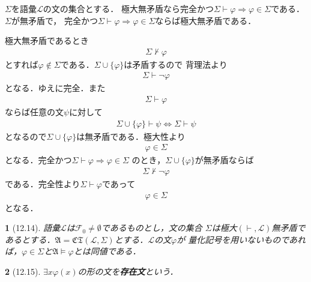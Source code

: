 \documentclass[a4j,10.5pt,oneside,openany]{jsbook}
\theoremstyle{mystyle}
\newtheorem{thm}{\color{DarkMidnightBlue}{定理}}[section]
\newtheorem{dfn}[thm]{\color{PakistanGreen}{定義}}
\begin{document}
	\begin{screen}
		$\Sigma$を語彙$\mathcal{L}$の文の集合とする．
		極大無矛盾なら完全かつ$\Sigma \vdash \varphi
		\Longrightarrow \varphi \in \Sigma$である．$\Sigma$が無矛盾で，
		完全かつ$\Sigma \vdash \varphi
		\Longrightarrow \varphi \in \Sigma$ならば極大無矛盾である．
	\end{screen}
	
	極大無矛盾であるとき
	\begin{align}
		\Sigma \not\vdash \varphi
	\end{align}
	とすれば$\varphi \notin \Sigma$である．$\Sigma \cup \{\varphi\}$は矛盾するので
	背理法より
	\begin{align}
		\Sigma \vdash \neg \varphi
	\end{align}
	となる．ゆえに完全．また
	\begin{align}
		\Sigma \vdash \varphi
	\end{align}
	ならば任意の文$\psi$に対して
	\begin{align}
		\Sigma \cup \{\varphi\} \vdash \psi \Longleftrightarrow \Sigma \vdash \psi
	\end{align}
	となるので$\Sigma \cup \{\varphi\}$は無矛盾である．極大性より
	\begin{align}
		\varphi \in \Sigma
	\end{align}
	となる．完全かつ$\Sigma \vdash \varphi \Longrightarrow \varphi \in \Sigma$
	のとき，$\Sigma \cup \{\varphi\}$が無矛盾ならば
	\begin{align}
		\Sigma \not\vdash \neg \varphi
	\end{align}
	である．完全性より$\Sigma \vdash \varphi$であって
	\begin{align}
		\varphi \in \Sigma
	\end{align}
	となる．
	
	\begin{screen}
		\begin{thm}[12.14]
			語彙$\mathcal{L}$は$\mathcal{F}_{0} \neq \emptyset$であるものとし，文の集合
			$\Sigma$は極大$(\vdash,\mathcal{L})$無矛盾であるとする．$\mathfrak{A} = 
			\mathfrak{CT}(\mathcal{L},\Sigma)$とする．$\mathcal{L}$の文$\varphi$が
			量化記号を用いないものであれば，$\varphi \in \Sigma$と$\mathfrak{A} \models
			\varphi$とは同値である．
		\end{thm}
	\end{screen}
	
	\begin{screen}
		\begin{dfn}[12.15]
			$\exists x \varphi(x)$の形の文を{\bf 存在文}という．
		\end{dfn}
	\end{screen}
	
\end{document}
